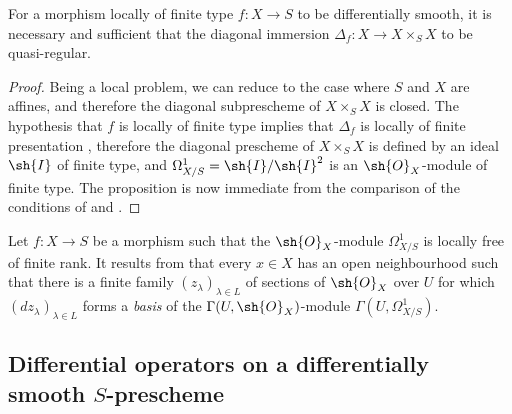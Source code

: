\begin{proposition}[16.10.5]
\label{IV.16.10.5}
For a morphism locally of finite type $f:X \to S$ to be differentially smooth, it is necessary and sufficient that the diagonal immersion $\Delta_f:X \to X \times_S X$ to be quasi-regular.
\end{proposition}
  

\begin{proof}
Being a local problem, we can reduce to the case where $S$ and $X$ are affines, and therefore the diagonal subprescheme of $X \times_S X$ is closed.
The hypothesis that $f$ is locally of finite type implies that $\Delta_f$ is locally of finite presentation , therefore the diagonal prescheme of $X \times_S X$ is defined by an ideal $\sh{I}$ of finite type, and $\Omega_{X/S}^1 = \sh{I}/\sh{I}^2$ is an $\sh{O}_X$-module of finite type.
The proposition is now immediate from the comparison of the conditions of  and . 
\end{proof}

\begin{remark}[16.10.6]
\label{IV.16.10.6}
Let $f:X \to S$ be a morphism such that the $\sh{O}_X$-module $\Omega_{X/S}^1$ is locally free of finite rank.
It results from  that every $x \in X$ has an open neighbourhood such that there is a finite family $(z_\lambda)_{\lambda \in L}$ of sections of $\sh{O}_X$ over $U$ for which $(dz_\lambda)_{\lambda \in L}$ forms a \emph{basis} of the $\Gamma(U, \sh{O}_X)$-module $\Gamma(U, \Omega_{X/S}^1)$.
\end{remark}

\subsection{Differential operators on a differentially smooth $S$-prescheme}
\label{IV.16.11}


